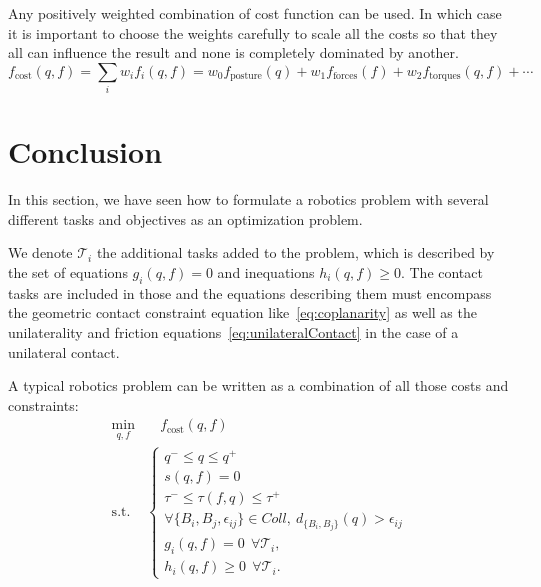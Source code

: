Any positively weighted combination of cost function can be used. In which case it is important to choose the weights carefully to scale all the costs so that they all can influence the result and none is completely dominated by another.
\begin{equation}
  f_\text{cost}(q,f) = \sum\limits_i{w_i f_i(q,f)} = w_0 f_\text{posture}(q) + w_1 f_\text{forces}(f) + w_2 f_\text{torques}(q,f) + \cdots
\end{equation}



\section{Conclusion}
\label{sec:Ch1_Conclusion}


In this section, we have seen how to formulate a robotics problem with several different tasks and objectives as an optimization problem.

We denote $\mathcal{T}_i$ the additional tasks added to the problem, which is described by the set of equations $g_i(q,f) = 0$ and inequations $h_i(q,f) \geq 0$.
The contact tasks are included in those and the equations describing them must encompass the geometric contact constraint equation like~\ref{eq:coplanarity} as well as the unilaterality and friction equations~\ref{eq:unilateralContact} in the case of a unilateral contact.

A typical robotics problem can be written as a combination of all those costs and constraints:
\begin{align}
\min_{q, f} & \quad f_\text{cost}(q,f) \nonumber\\
\text{s.t.}&
\left\{
\begin{array}{lr}
q^- \le q \le q^+\\
s(q,f) = 0 \\
\tau^- \le \tau(f,q) \le \tau^+\\
\forall \{B_i, B_j, \epsilon_{ij}\} \in Coll,\ d_{\{B_i, B_j\}}(q) > \epsilon_{ij}\\
g_i(q,f) = 0\ \ \forall\mathcal{T}_i,\\
h_i(q,f) \geq 0\ \ \forall\mathcal{T}_i.
\end{array}\right.
\label{eq:PG}
\end{align}




